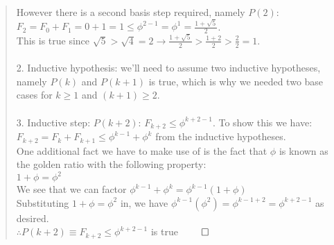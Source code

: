\documentclass[12pt]{article}
\newenvironment{problem}[2][Problem]{\begin{trivlist}
\item[\hskip \labelsep {\bfseries #1}\hskip \labelsep {\bfseries #2.}]}{\end{trivlist}}
\begin{document}
\begin{problem}{statement}
\begin{quote}
        However there is a second basis step required, namely $P(2)$:\\
        $F_2 = F_0 + F_1 = 0 + 1 = 1 \leq \phi^{2-1} = \phi^1 = \frac{1+\sqrt{5}}{2}$.\\
        This is true since $\sqrt{5} > \sqrt{4} = 2 \rightarrow \frac{1+\sqrt{5}}{2} > \frac{1+2}{2} > \frac{2}{2} = 1$.\\\\
        2. Inductive hypothesis: we'll need to assume two inductive hypotheses, 
        namely $P(k)$ and $P(k+1)$ is true, which is why we needed two base cases for $k \geq 1$ and $(k+1) \geq 2$.\\
        \pagebreak
        \\3. Inductive step: $P(k+2)$: $F_{k+2} \leq \phi^{k+2-1}$. To show this we have:\\
        $F_{k+2} = F_k + F_{k+1} \leq \phi^{k-1} + \phi^k$ from the inductive hypotheses.\\
        One additional fact we have to make use of is the fact that $\phi$ is known as the golden ratio with the following property:\\
        $1 + \phi = \phi^2$\\
        We see that we can factor $\phi^{k-1} + \phi^k = \phi^{k-1}(1+\phi)$\\
        Substituting $1 + \phi = \phi^2$ in, we have $\phi^{k-1}(\phi^2) = \phi^{k-1+2} = \phi^{k+2-1}$ as desired.\\
        $\therefore P(k+2) \equiv F_{k+2} \leq \phi^{k+2-1}$ is true $\qed$

    \end{quote}
\end{problem}
 
\end{document}
